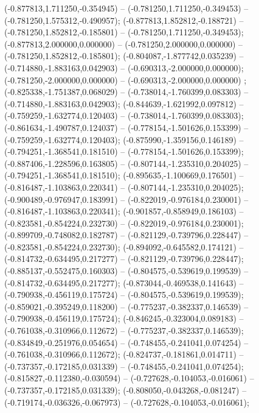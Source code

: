  (-0.877813,1.711250,-0.354945) -- (-0.781250,1.711250,-0.349453) -- (-0.781250,1.575312,-0.490957);
 (-0.877813,1.852812,-0.188721) -- (-0.781250,1.852812,-0.185801) -- (-0.781250,1.711250,-0.349453);
 (-0.877813,2.000000,0.000000) -- (-0.781250,2.000000,0.000000) -- (-0.781250,1.852812,-0.185801);
 (-0.804087,-1.877742,0.035239) -- (-0.714880,-1.883163,0.042903) -- (-0.690313,-2.000000,0.000000);
 (-0.781250,-2.000000,0.000000) -- (-0.690313,-2.000000,0.000000) ;
 (-0.825338,-1.751387,0.068029) -- (-0.738014,-1.760399,0.083303) -- (-0.714880,-1.883163,0.042903);
 (-0.844639,-1.621992,0.097812) -- (-0.759259,-1.632774,0.120403) -- (-0.738014,-1.760399,0.083303);
 (-0.861634,-1.490787,0.124037) -- (-0.778154,-1.501626,0.153399) -- (-0.759259,-1.632774,0.120403);
 (-0.875990,-1.359156,0.146189) -- (-0.794251,-1.368541,0.181510) -- (-0.778154,-1.501626,0.153399);
 (-0.887406,-1.228596,0.163805) -- (-0.807144,-1.235310,0.204025) -- (-0.794251,-1.368541,0.181510);
 (-0.895635,-1.100669,0.176501) -- (-0.816487,-1.103863,0.220341) -- (-0.807144,-1.235310,0.204025);
 (-0.900489,-0.976947,0.183991) -- (-0.822019,-0.976184,0.230001) -- (-0.816487,-1.103863,0.220341);
 (-0.901857,-0.858949,0.186103) -- (-0.823581,-0.854224,0.232730) -- (-0.822019,-0.976184,0.230001);
 (-0.899709,-0.748082,0.182787) -- (-0.821129,-0.739796,0.228447) -- (-0.823581,-0.854224,0.232730);
 (-0.894092,-0.645582,0.174121) -- (-0.814732,-0.634495,0.217277) -- (-0.821129,-0.739796,0.228447);
 (-0.885137,-0.552475,0.160303) -- (-0.804575,-0.539619,0.199539) -- (-0.814732,-0.634495,0.217277);
 (-0.873044,-0.469538,0.141643) -- (-0.790938,-0.456119,0.175724) -- (-0.804575,-0.539619,0.199539);
 (-0.859021,-0.395249,0.118200) -- (-0.775237,-0.382337,0.146539) -- (-0.790938,-0.456119,0.175724);
 (-0.846245,-0.323004,0.089183) -- (-0.761038,-0.310966,0.112672) -- (-0.775237,-0.382337,0.146539);
 (-0.834849,-0.251976,0.054654) -- (-0.748455,-0.241041,0.074254) -- (-0.761038,-0.310966,0.112672);
 (-0.824737,-0.181861,0.014711) -- (-0.737357,-0.172185,0.031339) -- (-0.748455,-0.241041,0.074254);
 (-0.815827,-0.112380,-0.030594) -- (-0.727628,-0.104053,-0.016061) -- (-0.737357,-0.172185,0.031339);
 (-0.808050,-0.043268,-0.081247) -- (-0.719174,-0.036326,-0.067973) -- (-0.727628,-0.104053,-0.016061);
